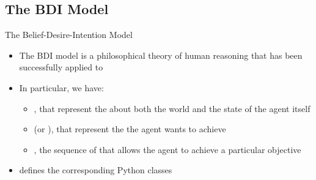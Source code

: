 \subsection{The BDI Model}
\begin{frame}[label=2]{The Belief-Desire-Intention Model}
  \begin{itemize}
    \item
      The BDI model is a philosophical theory of human reasoning 
      that has been successfully applied to  
\N
    \item 
      In particular, we have:
      \begin{itemize}
      \n
        \item 
          , that represent the  
          about both the world and the state of the agent itself
      \n
        \item
           (or ), that represent the 
           the agent wants to achieve
      \n
        \item
          , the sequence of  that allows 
          the agent to achieve a particular objective
      \end{itemize} 
\N
    \item
       defines the corresponding Python classes
    \end{itemize}
\N\N
\end{frame}



